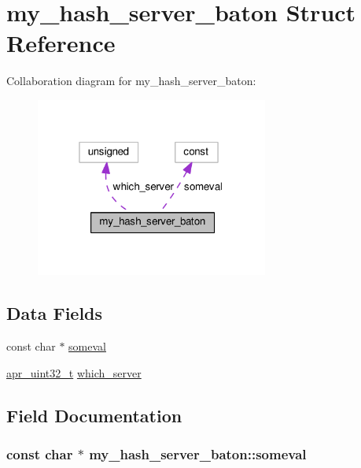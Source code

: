 \hypertarget{structmy__hash__server__baton}{}\section{my\+\_\+hash\+\_\+server\+\_\+baton Struct Reference}
\label{structmy__hash__server__baton}


Collaboration diagram for my\+\_\+hash\+\_\+server\+\_\+baton\+:
\nopagebreak
\begin{figure}[H]
\begin{center}
\leavevmode
\includegraphics[width=217pt]{structmy__hash__server__baton__coll__graph}
\end{center}
\end{figure}
\subsection*{Data Fields}
\begin{DoxyCompactItemize}
\item 
const char $\ast$ \hyperlink{structmy__hash__server__baton_a893d9a51f30218b114706f301af01fa5}{someval}
\item 
\hyperlink{group__apr__platform_ga558548a135d8a816c4787250744ea147}{apr\+\_\+uint32\+\_\+t} \hyperlink{structmy__hash__server__baton_a3649258662914c7ddf0124a2a4e123de}{which\+\_\+server}
\end{DoxyCompactItemize}


\subsection{Field Documentation}
\subsubsection[{\texorpdfstring{someval}{someval}}]{\setlength{\rightskip}{0pt plus 5cm}const char $\ast$ my\+\_\+hash\+\_\+server\+\_\+baton\+::someval}\hypertarget{structmy__hash__server__baton_a893d9a51f30218b114706f301af01fa5}{}\label{structmy__hash__server__baton_a893d9a51f30218b114706f301af01fa5}
